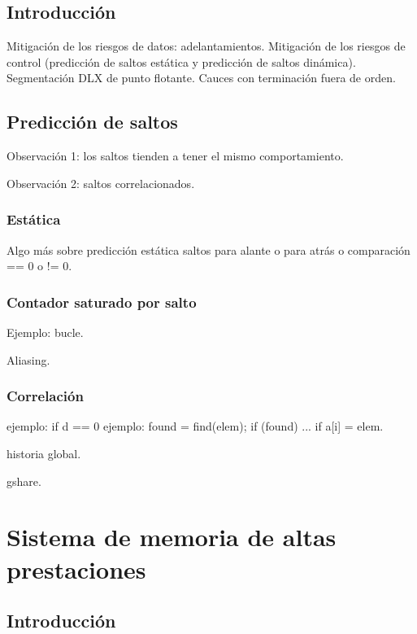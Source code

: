 \documentclass[12pt,onecolumn]{memoir}
\begin{document}
\section{Introducción}
\label{sec:introduccion_avanzada}

Mitigación de los riesgos de datos: adelantamientos. Mitigación de los riesgos de control (predicción de saltos estática y predicción de saltos dinámica). Segmentación DLX de punto flotante. Cauces con terminación fuera de orden.

\section{Predicción de saltos}

Observación 1: los saltos tienden a tener el mismo comportamiento.

Observación 2: saltos correlacionados.

\subsection{Estática}

Algo más sobre predicción estática saltos para alante o para atrás o comparación == 0 o != 0.

\subsection{Contador saturado por salto}

Ejemplo: bucle.

Aliasing.

\subsection{Correlación}

ejemplo: if d == 0
ejemplo: found = find(elem); if (found) ...  if a[i] = elem.

historia global.

gshare.


\chapter{Sistema de memoria de altas prestaciones}
\label{cap:memoria}


\section{Introducción}
\label{sec:introduccion_memoria}
\end{document}
